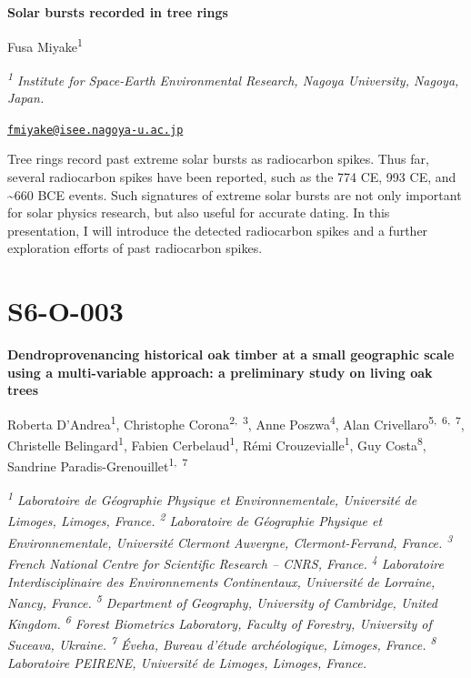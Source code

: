 \documentclass[
]{book}
\begin{document}
\textbf{Solar bursts recorded in tree rings}

Fusa Miyake\textsuperscript{1}

\emph{\textsuperscript{1} Institute for Space-Earth Environmental Research, Nagoya University, Nagoya, Japan.}

\href{mailto:fmiyake@isee.nagoya-u.ac.jp}{\nolinkurl{fmiyake@isee.nagoya-u.ac.jp}}

Tree rings record past extreme solar bursts as radiocarbon spikes. Thus far, several radiocarbon spikes have been reported, such as the 774 CE, 993 CE, and \textasciitilde660 BCE events. Such signatures of extreme solar bursts are not only important for solar physics research, but also useful for accurate dating. In this presentation, I will introduce the detected radiocarbon spikes and a further exploration efforts of past radiocarbon spikes.

\hypertarget{s6-o-003}{%
\section*{S6-O-003}\label{s6-o-003}}

\textbf{Dendroprovenancing historical oak timber at a small geographic scale using a multi-variable approach: a preliminary study on living oak trees}

Roberta D'Andrea\textsuperscript{1}, Christophe Corona\textsuperscript{2,~3}, Anne Poszwa\textsuperscript{4}, Alan Crivellaro\textsuperscript{5,~6,~7}, Christelle Belingard\textsuperscript{1}, Fabien Cerbelaud\textsuperscript{1}, Rémi Crouzevialle\textsuperscript{1}, Guy Costa\textsuperscript{8}, Sandrine Paradis-Grenouillet\textsuperscript{1,~7}

\emph{\textsuperscript{1} Laboratoire de Géographie Physique et Environnementale, Université de Limoges, Limoges, France. \textsuperscript{2} Laboratoire de Géographie Physique et Environnementale, Université Clermont Auvergne, Clermont-Ferrand, France. \textsuperscript{3} French National Centre for Scientific Research -- CNRS, France. \textsuperscript{4} Laboratoire Interdisciplinaire des Environnements Continentaux, Université de Lorraine, Nancy, France. \textsuperscript{5} Department of Geography, University of Cambridge, United Kingdom. \textsuperscript{6} Forest Biometrics Laboratory, Faculty of Forestry, University of Suceava, Ukraine. \textsuperscript{7} Éveha, Bureau d'étude archéologique, Limoges, France. \textsuperscript{8} Laboratoire PEIRENE, Université de Limoges, Limoges, France.}
\end{document}
